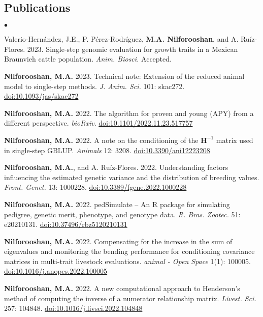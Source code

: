 \documentclass[margin,line]{res}
\newenvironment{list2}{
  \begin{list}{$\bullet$}{%
      \setlength{\itemsep}{0in}
      \setlength{\parsep}{0in} \setlength{\parskip}{0in}
      \setlength{\topsep}{0in} \setlength{\partopsep}{0in}
      \setlength{\leftmargin}{0.2in}}}{\end{list}}
\begin{document}
\begin{resume}
\section{\sc Publications}

\begin{list2}
\item Valerio-Hern\'{a}ndez, J.E., P. P\'{e}rez-Rodr\'{i}guez, {\bf M.A. Nilforooshan}, and A. Ru\'{i}z-Flores. 2023. Single-step genomic evaluation for growth traits in a Mexican Braunvieh cattle population. {\em Anim. Biosci.} Accepted.
\item {\bf Nilforooshan, M.A.} 2023. Technical note: Extension of the reduced animal model to single-step methods. {\em J. Anim. Sci.} 101: skac272. \href{https://doi.org/10.1093/jas/skac272}{doi:10.1093/jas/skac272}
\item {\bf Nilforooshan, M.A.} 2022. The algorithm for proven and young (APY) from a different perspective. {\em bioRxiv}. \href{https://doi.org/10.1101/2022.11.23.517757}{doi:10.1101/2022.11.23.517757}
\item {\bf Nilforooshan, M.A.} 2022. A note on the conditioning of the $\mathbf H^{-1}$ matrix used in single-step GBLUP. {\em Animals} 12: 3208. \href{https://doi.org/10.3390/ani12223208}{doi:10.3390/ani12223208}
\item {\bf Nilforooshan, M.A.}, and A. Ru\'{i}z-Flores. 2022. Understanding factors influencing the estimated genetic variance and the distribution of breeding values. {\em Front. Genet.} 13: 1000228. \href{https://doi.org/10.3389/fgene.2022.1000228}{doi:10.3389/fgene.2022.1000228}
\item {\bf Nilforooshan, M.A.} 2022. pedSimulate -- An R package for simulating pedigree, genetic merit, phenotype, and genotype data. {\em R. Bras. Zootec.} 51: e20210131. \href{https://doi.org/10.37496/rbz5120210131}{doi:10.37496/rbz5120210131}
\item {\bf Nilforooshan, M.A.} 2022. Compensating for the increase in the sum of eigenvalues and monitoring the bending performance for conditioning covariance matrices in multi-trait livestock evaluations. {\em animal - Open Space} 1(1): 100005. \href{https://doi.org/10.1016/j.anopes.2022.100005}{doi:10.1016/j.anopes.2022.100005}
\item {\bf Nilforooshan, M.A.} 2022. A new computational approach to Henderson's method of computing the inverse of a numerator relationship matrix. {\em Livest. Sci.} 257: 104848. \href{https://doi.org/10.1016/j.livsci.2022.104848}{doi:10.1016/j.livsci.2022.104848}

\end{list2}
\end{resume}
\end{document}
